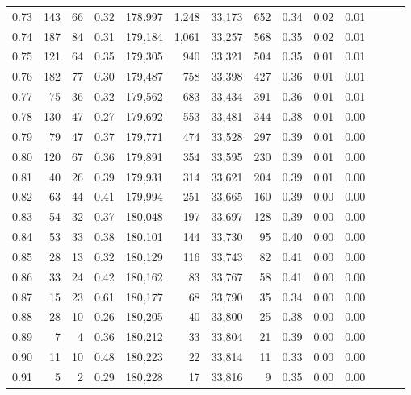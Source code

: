 \begin{tabular}{rrrrrrrrrrrrrr}
0.73 &    143 &   66 &  0.32 &  178,997 &    1,248 &  33,173 &     652 &  0.34 &  0.02 &      0.01 \\
0.74 &    187 &   84 &  0.31 &  179,184 &    1,061 &  33,257 &     568 &  0.35 &  0.02 &      0.01 \\
0.75 &    121 &   64 &  0.35 &  179,305 &      940 &  33,321 &     504 &  0.35 &  0.01 &      0.01 \\
0.76 &    182 &   77 &  0.30 &  179,487 &      758 &  33,398 &     427 &  0.36 &  0.01 &      0.01 \\
0.77 &     75 &   36 &  0.32 &  179,562 &      683 &  33,434 &     391 &  0.36 &  0.01 &      0.01 \\
0.78 &    130 &   47 &  0.27 &  179,692 &      553 &  33,481 &     344 &  0.38 &  0.01 &      0.00 \\
0.79 &     79 &   47 &  0.37 &  179,771 &      474 &  33,528 &     297 &  0.39 &  0.01 &      0.00 \\
0.80 &    120 &   67 &  0.36 &  179,891 &      354 &  33,595 &     230 &  0.39 &  0.01 &      0.00 \\
0.81 &     40 &   26 &  0.39 &  179,931 &      314 &  33,621 &     204 &  0.39 &  0.01 &      0.00 \\
0.82 &     63 &   44 &  0.41 &  179,994 &      251 &  33,665 &     160 &  0.39 &  0.00 &      0.00 \\
0.83 &     54 &   32 &  0.37 &  180,048 &      197 &  33,697 &     128 &  0.39 &  0.00 &      0.00 \\
0.84 &     53 &   33 &  0.38 &  180,101 &      144 &  33,730 &      95 &  0.40 &  0.00 &      0.00 \\
0.85 &     28 &   13 &  0.32 &  180,129 &      116 &  33,743 &      82 &  0.41 &  0.00 &      0.00 \\
0.86 &     33 &   24 &  0.42 &  180,162 &       83 &  33,767 &      58 &  0.41 &  0.00 &      0.00 \\
0.87 &     15 &   23 &  0.61 &  180,177 &       68 &  33,790 &      35 &  0.34 &  0.00 &      0.00 \\
0.88 &     28 &   10 &  0.26 &  180,205 &       40 &  33,800 &      25 &  0.38 &  0.00 &      0.00 \\
0.89 &      7 &    4 &  0.36 &  180,212 &       33 &  33,804 &      21 &  0.39 &  0.00 &      0.00 \\
0.90 &     11 &   10 &  0.48 &  180,223 &       22 &  33,814 &      11 &  0.33 &  0.00 &      0.00 \\
0.91 &      5 &    2 &  0.29 &  180,228 &       17 &  33,816 &       9 &  0.35 &  0.00 &      0.00 \\

\end{tabular}
